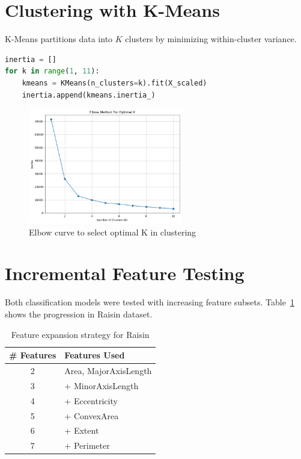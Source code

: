 \section{Clustering with K-Means}

K-Means partitions data into $K$ clusters by minimizing within-cluster variance.

\begin{lstlisting}[language=Python, caption={Elbow Method for K selection}, label=list:kmeans_code]
inertia = []
for k in range(1, 11):
    kmeans = KMeans(n_clusters=k).fit(X_scaled)
    inertia.append(kmeans.inertia_)
\end{lstlisting}

\begin{figure}[H]
    \centering
    \includegraphics[width=0.6\textwidth]{figures/kmeans_elbow.png}
    \caption{Elbow curve to select optimal K in clustering}
    \label{fig:elbow_curve}
\end{figure}

\section{Incremental Feature Testing}

Both classification models were tested with increasing feature subsets. Table~\ref{tab:feature_growth} shows the progression in Raisin dataset.

\begin{table}[H]
    \centering
    \caption{Feature expansion strategy for Raisin}
    \label{tab:feature_growth}
    \begin{tabular}{|c|l|}
        \hline
        \# Features & Features Used \\
        \hline
        2 & Area, MajorAxisLength \\
        3 & + MinorAxisLength \\
        4 & + Eccentricity \\
        5 & + ConvexArea \\
        6 & + Extent \\
        7 & + Perimeter \\
        \hline
    \end{tabular}
\end{table}

